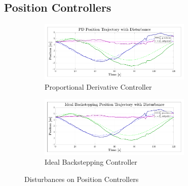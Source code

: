 \subsection{Position Controllers}
\label{app:disturbance.position}
\begin{figure}[htbp]
\centering
\begin{subfigure}{\textwidth}
\vspace{-12pt}
\centering
\includegraphics[width=0.8\textwidth]{graphs/PD_Position_Trajectory_dist}
\vspace{-12pt}
\caption{Proportional Derivative Controller}
\label{fig:app-position-pd-dist}
\end{subfigure}
\begin{subfigure}{\textwidth}
\vspace{-3pt}
\centering
\includegraphics[width=0.8\textwidth]{graphs/IBC_Position_Trajectory_dist}
\vspace{-12pt}
\caption{Ideal Backstepping Controller}
\label{fig:app-position-ibc-dist}
\end{subfigure}
\caption{Disturbances on Position Controllers}
\end{figure}